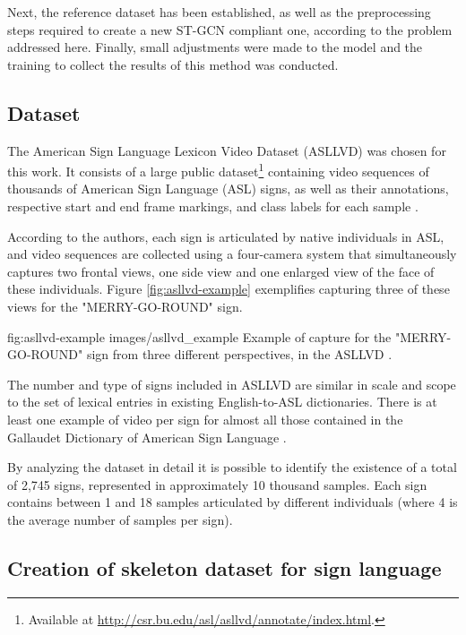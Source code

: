 Next, the reference dataset has been established, as well as the preprocessing steps required to create a new ST-GCN compliant one, according to the problem addressed here. Finally, small adjustments were made to the model and the training to collect the results of this method was conducted.


\subsection{Dataset} 
\label{sec:dataset}

The American Sign Language Lexicon Video Dataset (ASLLVD) was chosen for this work. It consists of a large public dataset\footnote{
   Available at \url{http://csr.bu.edu/asl/asllvd/annotate/index.html}.
} containing video sequences of thousands of American Sign Language (ASL) signs, as well as their annotations, respective start and end frame markings, and class labels for each sample \cite{ athitsos-asllvd-2008, neidle-2012, vloger-2012}.

According to the authors, each sign is articulated by native individuals in ASL, and video sequences are collected using a four-camera system that simultaneously captures two frontal views, one side view and one enlarged view of the face of these individuals. Figure \ref{fig:asllvd-example} exemplifies capturing three of these views for the "MERRY-GO-ROUND" sign. 

\image
    {fig:asllvd-example}
    {images/asllvd_example}
    {Example of capture for the "MERRY-GO-ROUND" sign from three different perspectives, in the ASLLVD \cite[p. 2]{athitsos-asllvd-2008}.}
    
The number and type of signs included in ASLLVD are similar in scale and scope to the set of lexical entries in existing English-to-ASL dictionaries. There is at least one example of video per sign for almost all those contained in the Gallaudet Dictionary of American Sign Language \cite{athitsos-asllvd-2008, gallaudet-2005}.

By analyzing the dataset in detail it is possible to identify the existence of a total of 2,745 signs, represented in approximately 10 thousand samples. Each sign contains between 1 and 18 samples articulated by different individuals (where 4 is the average number of samples per sign).


\subsection{Creation of skeleton dataset for sign language} 
\label{sec:criacao-dataset}

